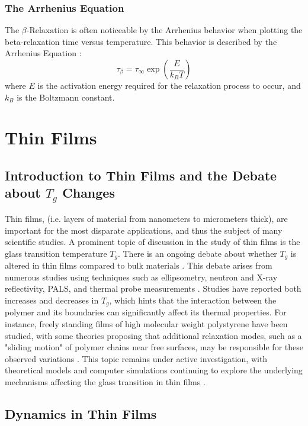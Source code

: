 \subsubsection{The Arrhenius Equation}

The $\beta\text{-Relaxation}$ is often noticeable by the Arrhenius behavior when plotting the beta-relaxation time versus temperature. This behavior is described by the Arrhenius Equation \cite{zhao2023}:
\begin{equation}
\label{arreq}
\tau_{\beta} = \tau_{\infty} \exp\left(\frac{E}{k_B T}\right)
\end{equation}
where \(E\) is the activation energy required for the relaxation process to occur, and \(k_B\) is the Boltzmann constant.

\section{Thin Films}
\subsection{Introduction to Thin Films and the Debate about $T_g$ Changes}
Thin films, (i.e. layers of material from nanometers to micrometers thick), are important for the most disparate applications, and thus the subject of many scientific studies. A prominent topic of discussion in the study of thin films is the glass transition temperature \(T_g\). There is an ongoing debate about whether \(T_g\) is altered in thin films compared to bulk materials \cite{serghei}. This debate arises from numerous studies using techniques such as ellipsometry, neutron and X-ray reflectivity, \ac{PALS}, and thermal probe measurements \cite{kawashima2009} \cite{stoev2014} \cite{MCKECHNIE2020122433}. Studies have reported both increases and decreases in \(T_g\), which hints that the interaction between the polymer and its boundaries can significantly affect its thermal properties. For instance, freely standing films of high molecular weight polystyrene have been studied, with some theories proposing that additional relaxation modes, such as a "sliding motion" of polymer chains near free surfaces, may be responsible for these observed variations \cite{FUJITA}. This topic remains under active investigation, with theoretical models and computer simulations continuing to explore the underlying mechanisms affecting the glass transition in thin films \cite{kremer2003}.
\subsection{Dynamics in Thin Films}

